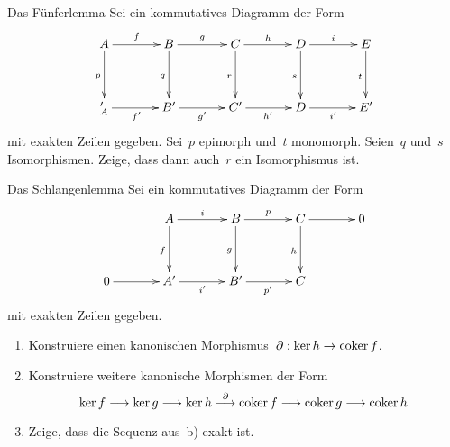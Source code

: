 \documentclass{uebblatt}
\begin{document}
\begin{aufgabe}{Das Fünferlemma}
Sei ein kommutatives Diagramm der Form
\[ \xymatrixcolsep{3pc}\xymatrixrowsep{3pc}\xymatrix{
  A \ar[r]^f \ar[d]_p & B \ar[r]^g \ar[d]_q & C \ar[r]^h \ar[d]_r & D \ar[r]^i \ar[d]_s & E \ar[d]_t \\
_  A' \ar[r]_{f'} & B' \ar[r]_{g'} & C' \ar[r]_{h'} & D \ar[r]_{i'} & E'
} \]
mit exakten Zeilen gegeben. Sei~$p$ epimorph und~$t$ monomorph. Seien~$q$
und~$s$ Isomorphismen. Zeige, dass dann auch~$r$ ein Isomorphismus ist.
\end{aufgabe}

\begin{aufgabe}{Das Schlangenlemma}
Sei ein kommutatives Diagramm der Form
\[ \xymatrixcolsep{3pc}\xymatrixrowsep{3pc}\xymatrix{
  & A \ar[r]^{i} \ar[d]_f & B \ar[r]^{p} \ar[d]_g & C \ar[r] \ar[d]_h & 0 \\
  0 \ar[r] & A' \ar[r]_{i'} & B' \ar[r]_{p'} & C
} \]
mit exakten Zeilen gegeben.
\begin{enumerate}
\item Konstruiere einen kanonischen Morphismus~$\partial : \operatorname{ker} h \to \operatorname{coker} f$.
\item Konstruiere weitere kanonische Morphismen der Form
\[ \operatorname{ker} f \longrightarrow \operatorname{ker} g \longrightarrow \operatorname{ker} h \stackrel{\partial}{\longrightarrow}
  \operatorname{coker} f \longrightarrow \operatorname{coker} g \longrightarrow \operatorname{coker} h. \]
\item Zeige, dass die Sequenz aus~b) exakt ist.
\end{enumerate}
\end{aufgabe}

\newpage
\end{document}
